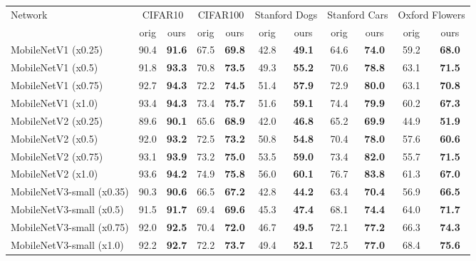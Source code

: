 \documentclass[10pt,twocolumn,letterpaper]{article}
\newcommand{\widthFactor}[1]{(x#1)}
\begin{document}
\begin{table*}[tb]
	\begin{center}
		\begin{tabular}{|l|c|c||c|c||c|c||c|c||c|c|}
			\hline
			Network & \multicolumn{2}{|c||}{CIFAR10} & \multicolumn{2}{|c||}{CIFAR100} & \multicolumn{2}{|c||}{Stanford Dogs} & \multicolumn{2}{|c||}{Stanford Cars}  & \multicolumn{2}{|c|}{Oxford Flowers} \\
			 &  orig & ours & orig & ours & orig & ours & orig & ours & orig & ours \\
			\hline
			\hline
			MobileNetV1 \widthFactor{0.25} 			& 90.4 & \bf{91.6} & 67.5 & \bf{69.8} & 42.8 & \bf{49.1} & 64.6 & \bf{74.0} & 59.2 & \bf{68.0} \\
			MobileNetV1 \widthFactor{0.5} 			& 91.8 & \bf{93.3} & 70.8 & \bf{73.5} & 49.3 & \bf{55.2} & 70.6 & \bf{78.8} & 63.1 & \bf{71.5} \\
			MobileNetV1 \widthFactor{0.75}			& 92.7 & \bf{94.3} & 72.2 & \bf{74.5} & 51.4 & \bf{57.9} & 72.9 & \bf{80.0} & 63.1 & \bf{70.8} \\
			MobileNetV1 \widthFactor{1.0} 			& 93.4 & \bf{94.3} & 73.4 & \bf{75.7} & 51.6 & \bf{59.1} & 74.4 & \bf{79.9} & 60.2 & \bf{67.3} \\
			\hline
			MobileNetV2 \widthFactor{0.25} 			& 89.6 & \bf{90.1} & 65.6 & \bf{68.9} & 42.0 & \bf{46.8} & 65.2 & \bf{69.9} & 44.9 & \bf{51.9} \\
			MobileNetV2 \widthFactor{0.5} 			& 92.0 & \bf{93.2} & 72.5 & \bf{73.2} & 50.8 & \bf{54.8} & 70.4 & \bf{78.0} & 57.6 & \bf{60.6} \\
			MobileNetV2 \widthFactor{0.75}			& 93.1 & \bf{93.9} & 73.2 & \bf{75.0} & 53.5 & \bf{59.0} & 73.4 & \bf{82.0} & 55.7 & \bf{71.5} \\
			MobileNetV2 \widthFactor{1.0} 			& 93.6 & \bf{94.2} & 74.9 & \bf{75.8} & 56.0 & \bf{60.1} & 76.7 & \bf{83.8} & 61.3 & \bf{67.0} \\
			\hline
			MobileNetV3-small \widthFactor{0.35} 	& 90.3 & \bf{90.6} & 66.5 & \bf{67.2} & 42.8 & \bf{44.2} & 63.4 & \bf{70.4} & 56.9 & \bf{66.5} \\
			MobileNetV3-small \widthFactor{0.5} 		& 91.5 & \bf{91.7} & 69.4 & \bf{69.6} & 45.3 & \bf{47.4} & 68.1 & \bf{74.4} & 64.0 & \bf{71.7} \\
			MobileNetV3-small \widthFactor{0.75}		& 92.0 & \bf{92.5} & 70.4 & \bf{72.0} & 46.7 & \bf{49.5} & 72.1 & \bf{77.2} & 66.3 & \bf{74.3} \\
			MobileNetV3-small \widthFactor{1.0} 		& 92.2 & \bf{92.7} & 72.2 & \bf{73.7} & 49.4 & \bf{52.1} & 72.5 & \bf{77.0} & 68.4 & \bf{75.6} \\

\end{tabular}
\end{center}
\end{table*}
\end{document}
